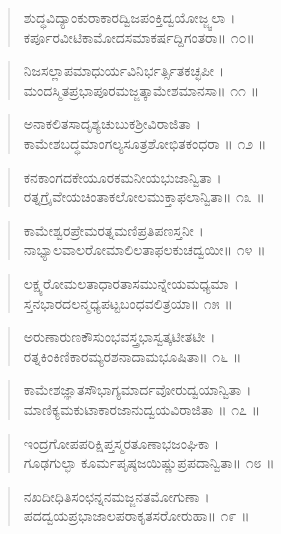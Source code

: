 \begin{verse}
ಶುದ್ಧವಿದ್ಯಾಂಕುರಾಕಾರದ್ವಿಜಪಂಕ್ತಿದ್ವಯೋಜ್ಜ್ವಲಾ ।\\ಕರ್ಪೂರವೀಟಿಕಾಮೋದಸಮಾಕರ್ಷದ್ದಿಗಂತರಾ\num{॥ ೧೦॥}
\end{verse}

\begin{verse}
ನಿಜಸಲ್ಲಾಪಮಾಧುರ್ಯವಿನಿರ್ಭರ್ತ್ಸಿತಕಚ್ಛಪೀ ।\\ಮಂದಸ್ಮಿತಪ್ರಭಾಪೂರಮಜ್ಜತ್ಕಾಮೇಶಮಾನಸಾ\num{॥ ೧೧ ॥}
\end{verse}

\begin{verse}
ಅನಾಕಲಿತಸಾದೃಶ್ಯಚುಬುಕಶ್ರೀವಿರಾಜಿತಾ ।\\ಕಾಮೇಶಬದ್ಧಮಾಂಗಲ್ಯಸೂತ್ರಶೋಭಿತಕಂಧರಾ \num{॥ ೧೨ ॥}
\end{verse}

\begin{verse}
ಕನಕಾಂಗದಕೇಯೂರಕಮನೀಯಭುಜಾನ್ವಿತಾ ।\\ರತ್ನಗ್ರೈವೇಯಚಿಂತಾಕಲೋಲಮುಕ್ತಾಫಲಾನ್ವಿತಾ\num{॥ ೧೩ ॥}
\end{verse}

\begin{verse}
ಕಾಮೇಶ್ವರಪ್ರೇಮರತ್ನಮಣಿಪ್ರತಿಪಣಸ್ತನೀ ।\\ನಾಭ್ಯಾಲವಾಲರೋಮಾಲಿಲತಾಫಲಕುಚದ್ವಯೀ\num{॥ ೧೪ ॥}
\end{verse}

\begin{verse}
ಲಕ್ಷ್ಯರೋಮಲತಾಧಾರತಾಸಮುನ್ನೇಯಮಧ್ಯಮಾ ।\\ಸ್ತನಭಾರದಲನ್ಮಧ್ಯಪಟ್ಟಬಂಧವಲಿತ್ರಯಾ\num{॥ ೧೫ ॥}
\end{verse}

\begin{verse}
ಅರುಣಾರುಣಕೌಸುಂಭವಸ್ತ್ರಭಾಸ್ವತ್ಕಟೀತಟೀ ।\\ರತ್ನಕಿಂಕಿಣಿಕಾರಮ್ಯರಶನಾದಾಮಭೂಷಿತಾ\num{॥ ೧೬ ॥}
\end{verse}

\begin{verse}
ಕಾಮೇಶಜ್ಞಾತಸೌಭಾಗ್ಯಮಾರ್ದವೋರುದ್ವಯಾನ್ವಿತಾ ।\\ಮಾಣಿಕ್ಯಮಕುಟಾಕಾರಜಾನುದ್ವಯವಿರಾಜಿತಾ \num{॥ ೧೭ ॥}
\end{verse}

\begin{verse}
ಇಂದ್ರಗೋಪಪರಿಕ್ಷಿಪ್ತಸ್ಮರತೂಣಾಭಜಂಘಿಕಾ ।\\ಗೂಢಗುಲ್ಫಾ ಕೂರ್ಮಪೃಷ್ಠಜಯಿಷ್ಣುಪ್ರಪದಾನ್ವಿತಾ\num{॥ ೧೮ ॥}
\end{verse}

\begin{verse}
ನಖದೀಧಿತಿಸಂಛನ್ನನಮಜ್ಜನತಮೋಗುಣಾ ।\\ಪದದ್ವಯಪ್ರಭಾಜಾಲಪರಾಕೃತಸರೋರುಹಾ\num{॥ ೧೯ ॥}
\end{verse}

